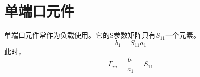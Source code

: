         
\section{单端口元件}
    单端口元件常作为负载使用。它的S参数矩阵只有$S_{11}$一个元素。
    \begin{equation}
        b_1=S_{11}a_1
    \end{equation}
    此时，
    \begin{equation}
        \varGamma_{in}=\frac{b_1}{a_1}=S_{11}
    \end{equation}
    
